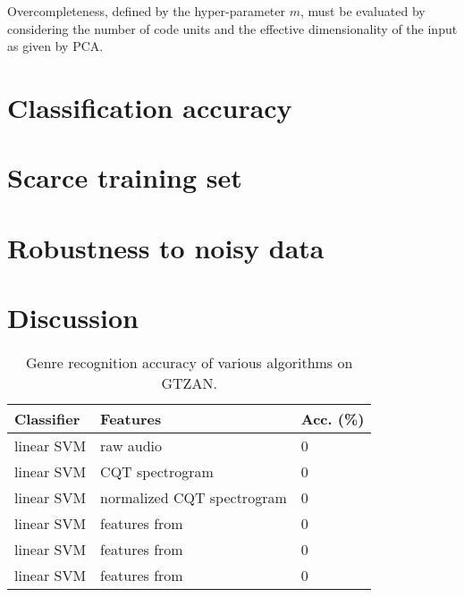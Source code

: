 Overcompleteness, defined by the hyper-parameter $m$, must be evaluated by considering the number of code units and the effective dimensionality of the input as given by \gls{PCA}.

\section{Classification accuracy}


\section{Scarce training set}

\section{Robustness to noisy data}

\section{Discussion}

\begin{table}
	\begin{center}
		\begin{tabular}{|l|l|l|}
			\hline
			Classifier & Features & Acc. (\%) \\
			\hline
			linear SVM & raw audio & 0 \\
			linear SVM & CQT spectrogram & 0 \\
			linear SVM & normalized CQT spectrogram & 0 \\
			linear SVM & features from \eqnref{basispursuit} & 0 \\
			linear SVM & features from \eqnref{minz} & 0 \\
			linear SVM & features from \eqnref{extraction} & 0 \\
			\hline
		\end{tabular}
	\end{center}
	\caption{Genre recognition accuracy of various algorithms on GTZAN.}
	\label{tab:accuracy_comparison}
\end{table}

